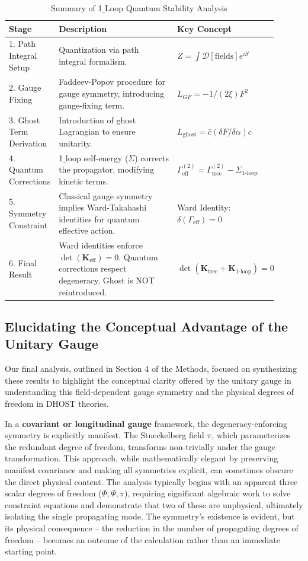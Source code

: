 \documentclass[twocolumn]{aastex631}
\begin{document}
\begin{table}[h!]
\centering
\caption{Summary of 1\ensuremath{\_}Loop Quantum Stability Analysis}
\label{tab:quantum_stability_summary}
\begin{tabular}{p{0.15\linewidth}|p{0.55\linewidth}|p{0.2\linewidth}}
\hline
\textbf{Stage} & \textbf{Description} & \textbf{Key Concept} \\ \hline
1. Path Integral Setup & Quantization via path integral formalism. & $Z = \int \mathcal{D}[\text{fields}] e^{iS}$ \\
2. Gauge Fixing & Faddeev-Popov procedure for gauge symmetry, introducing gauge-fixing term. & $L_{GF} = -1/(2\xi) F^2$ \\
3. Ghost Term Derivation & Introduction of ghost Lagrangian to ensure unitarity. & $L_{\text{ghost}} = \bar{c} (\delta F / \delta \alpha) c$ \\
4. Quantum Corrections & 1\ensuremath{\_}loop self-energy ($\Sigma$) corrects the propagator, modifying kinetic terms. & $\Gamma^{(2)}_{\text{eff}} = \Gamma^{(2)}_{\text{tree}} - \Sigma_{\text{1-loop}}$ \\
5. Symmetry Constraint & Classical gauge symmetry implies Ward-Takahashi identities for quantum effective action. & Ward Identity: $\delta(\Gamma_{\text{eff}}) = 0$ \\
6. Final Result & Ward identities enforce $\det(\mathbf{K}_{\text{eff}}) = 0$. Quantum corrections respect degeneracy. Ghost is NOT reintroduced. & $\det(\mathbf{K}_{\text{tree}} + \mathbf{K}_{\text{1-loop}}) = 0$ \\ \hline
\end{tabular}
\end{table}

\subsection{Elucidating the Conceptual Advantage of the Unitary Gauge}

Our final analysis, outlined in Section 4 of the Methods, focused on synthesizing these results to highlight the conceptual clarity offered by the unitary gauge in understanding this field-dependent gauge symmetry and the physical degrees of freedom in DHOST theories.

In a \textbf{covariant or longitudinal gauge} framework, the degeneracy-enforcing symmetry is explicitly manifest. The Stueckelberg field $\pi$, which parameterizes the redundant degree of freedom, transforms non-trivially under the gauge transformation. This approach, while mathematically elegant by preserving manifest covariance and making all symmetries explicit, can sometimes obscure the direct physical content. The analysis typically begins with an apparent three scalar degrees of freedom ($\Phi, \Psi, \pi$), requiring significant algebraic work to solve constraint equations and demonstrate that two of these are unphysical, ultimately isolating the single propagating mode. The symmetry's existence is evident, but its physical consequence -- the reduction in the number of propagating degrees of freedom -- becomes an outcome of the calculation rather than an immediate starting point.
\end{document}
